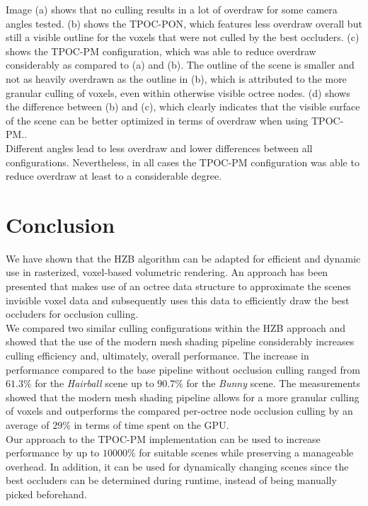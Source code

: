 \documentclass[conference]{IEEEtran}
\begin{document}
\noindent
Image (a) shows that no culling results in a lot of overdraw for some camera angles tested. (b) shows 
the \ac{TPOC-PON}, which features less overdraw overall but still a visible outline 
for the voxels that were not culled by the best occluders. (c) shows the \ac{TPOC-PM} 
configuration, which was able to reduce overdraw considerably as compared to (a) and (b). The outline 
of the scene is smaller and not as heavily overdrawn as the outline in (b), which is attributed to the 
more granular culling of voxels, even within otherwise visible octree nodes. (d) shows the difference 
between (b) and (c), which clearly indicates that the visible surface of the scene can be better 
optimized in terms of overdraw when using \ac{TPOC-PM}.. \\

\noindent
Different angles lead to less overdraw and lower differences between all configurations. Nevertheless, 
in all cases the \ac{TPOC-PM} configuration was able to reduce overdraw at least to a 
considerable degree.

\section{Conclusion} \label{sec-conclusion}

\noindent
We have shown that the \ac{HZB} algorithm can be adapted for efficient and dynamic use in rasterized, voxel-based 
volumetric rendering. An approach has been presented that makes use of an octree data structure to approximate 
the scenes invisible voxel data and subsequently uses this data to efficiently draw the best occluders for occlusion 
culling. \\

\noindent
We compared two similar culling configurations within the \ac{HZB} approach and showed that the use of the 
modern mesh shading pipeline considerably increases culling efficiency and, ultimately, overall performance.
The increase in performance compared to the base pipeline without occlusion culling ranged from $61.3 \%$ for 
the \emph{Hairball} scene up to $90.7 \%$ for the \emph{Bunny} scene. The measurements showed that the modern 
mesh shading pipeline allows for a more granular culling of voxels and outperforms the compared per-octree 
node occlusion culling by an average of $29 \%$ in terms of time spent on the \ac{GPU}. \\

\noindent       %
Our approach to the \ac{TPOC-PM} implementation can be used to increase performance by up to $10000\%$ for 
suitable scenes while preserving a manageable overhead. In addition, it can be used for dynamically changing 
scenes since the best occluders can be determined during runtime, instead of being manually picked beforehand. \\
\end{document}
